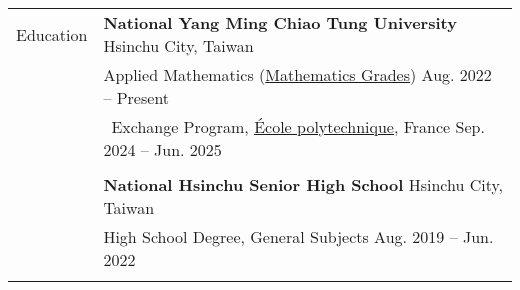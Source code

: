 \documentclass[letterpaper, 11pt]{article}
\begin{document}
\begin{center}
    \begin{longtable}{p{0.76in}p{5.93in}}

        
        
        
        \textcolor{OliveGreen}{Education} 
        & \textbf{National Yang Ming Chiao Tung University} \hfill Hsinchu City, Taiwan \\ 
        & Applied Mathematics (\href{https://docs.google.com/spreadsheets/d/1hz9FwNdFio4EajAw5VN3lpa6QyxIE2GJ6FpHmMoSaaQ/edit?usp=sharing}{Mathematics Grades}) \hfill Aug. 2022 -- Present \\
        & \qquad \  Exchange Program, \href{https://www.polytechnique.edu}{\'Ecole polytechnique}, France \hfill Sep. 2024 -- Jun. 2025 \\
        & \\
        
        & \textbf{National Hsinchu Senior High School} \hfill Hsinchu City, Taiwan \\
        & High School Degree, General Subjects \hfill Aug. 2019 -- Jun. 2022\\
        & \\
        
        

\end{longtable}
\end{center}
\end{document}
